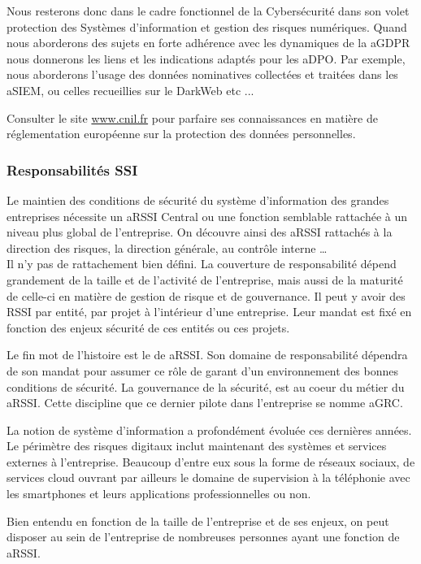 Nous resterons donc dans le cadre fonctionnel de la Cybersécurité dans son volet protection des Systèmes d'information et gestion des risques numériques.
Quand nous aborderons des sujets en forte adhérence avec les dynamiques de la \gls{aGDPR} nous donnerons les liens et les indications adaptés pour les \gls{aDPO}.
Par exemple, nous aborderons l'usage des données nominatives collectées et traitées dans les \gls{aSIEM}, ou celles recueillies sur le DarkWeb etc ...

Consulter le site \url{www.cnil.fr} pour parfaire ses connaissances en matière de réglementation européenne sur la protection des données personnelles. 


\subsubsection{Responsabilités SSI}

Le maintien des conditions de sécurité du système d'information des grandes entreprises nécessite un \gls{aRSSI} Central ou une fonction semblable rattachée à un niveau plus global de l'entreprise.
On découvre ainsi des  \gls{aRSSI} rattachés à la direction des risques, la direction générale, au contrôle interne …\\
 Il n'y pas de rattachement bien défini. La couverture de responsabilité dépend grandement de la taille et de l'activité de l'entreprise, mais aussi de la maturité de celle-ci en matière de gestion de risque et de gouvernance. Il peut y avoir des RSSI par entité, par projet à l’intérieur d'une entreprise. Leur mandat est fixé en fonction des enjeux sécurité de ces entités ou ces projets. 

Le fin mot de l'histoire est le  de  \gls{aRSSI}. Son domaine de responsabilité dépendra de son mandat pour assumer ce rôle de garant d'un environnement  des bonnes conditions de sécurité.
La gouvernance de la sécurité, est au coeur du métier du  \gls{aRSSI}. Cette discipline que ce dernier pilote dans l’entreprise se nomme \gls{aGRC}.

La notion de système d'information a profondément évoluée ces dernières années. Le périmètre des risques digitaux inclut maintenant des systèmes et services externes à l'entreprise. Beaucoup d'entre eux sous la forme de réseaux sociaux, de services cloud ouvrant par ailleurs le domaine de supervision à la téléphonie avec les smartphones et leurs applications professionnelles ou non.

Bien entendu en fonction de la taille de l'entreprise et de ses enjeux, on peut disposer au sein de l'entreprise de nombreuses personnes ayant une fonction de \gls{aRSSI}. 

